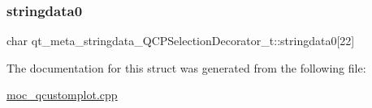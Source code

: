 \subsubsection{\texorpdfstring{stringdata0}{stringdata0}}
{\footnotesize\ttfamily char qt\+\_\+meta\+\_\+stringdata\+\_\+\+Q\+C\+P\+Selection\+Decorator\+\_\+t\+::stringdata0\mbox{[}22\mbox{]}}



The documentation for this struct was generated from the following file\+:\begin{DoxyCompactItemize}
\item 
\mbox{\hyperlink{moc__qcustomplot_8cpp}{moc\+\_\+qcustomplot.\+cpp}}\end{DoxyCompactItemize}
